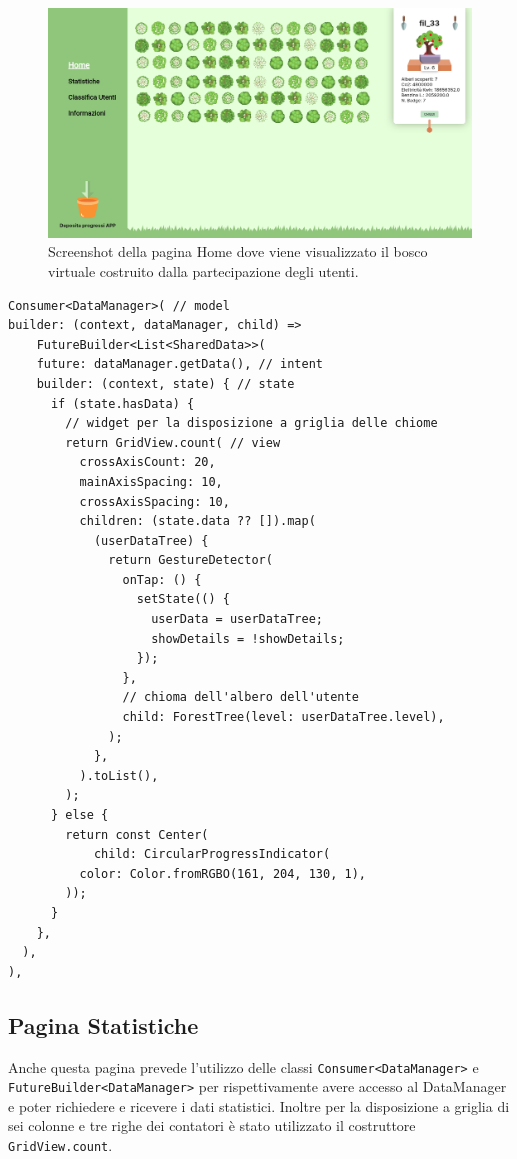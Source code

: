 \begin{figure}[h]
  \centering
  \includegraphics[width=\textwidth]{img/totem/screenshot/homepage.png}
  \caption{Screenshot della pagina Home dove viene visualizzato il bosco virtuale costruito dalla partecipazione degli utenti.}
  \label{fig:homepage}
\end{figure}

\begin{lstlisting}[style=FlutterStyle, caption={Parte del codice per la creazione del bosco della Homepage}, label={lst:homepageCode}]
Consumer<DataManager>( // model
builder: (context, dataManager, child) =>
    FutureBuilder<List<SharedData>>(
    future: dataManager.getData(), // intent
    builder: (context, state) { // state 
      if (state.hasData) {
        // widget per la disposizione a griglia delle chiome
        return GridView.count( // view
          crossAxisCount: 20,
          mainAxisSpacing: 10,
          crossAxisSpacing: 10,
          children: (state.data ?? []).map(
            (userDataTree) {
              return GestureDetector(
                onTap: () {
                  setState(() {
                    userData = userDataTree;
                    showDetails = !showDetails;
                  });
                },
                // chioma dell'albero dell'utente
                child: ForestTree(level: userDataTree.level),
              );
            },
          ).toList(),
        );
      } else {
        return const Center(
            child: CircularProgressIndicator(
          color: Color.fromRGBO(161, 204, 130, 1),
        ));
      }
    },
  ),
),
\end{lstlisting}
%
%
\subsection{Pagina Statistiche}
Anche questa pagina prevede l'utilizzo delle classi \texttt{Consumer<DataManager>} e \texttt{FutureBuilder<DataManager>} per rispettivamente avere accesso al DataManager e poter richiedere e ricevere i dati statistici. Inoltre per la disposizione a griglia di sei colonne e tre righe dei contatori è stato utilizzato il costruttore \texttt{GridView.count}.

